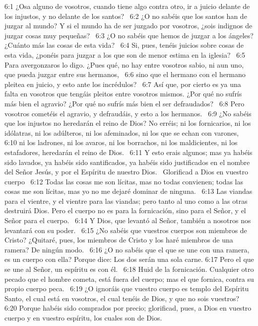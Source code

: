6:1 ¿Osa alguno de vosotros, cuando tiene algo contra otro, ir a juicio delante de los injustos, y no delante de los santos?  
6:2 ¿O no sabéis que los santos han de juzgar al mundo? Y si el mundo ha de ser juzgado por vosotros, ¿sois indignos de juzgar cosas muy pequeñas?  
6:3 ¿O no sabéis que hemos de juzgar a los ángeles? ¿Cuánto más las cosas de esta vida?  
6:4 Si, pues, tenéis juicios sobre cosas de esta vida, ¿ponéis para juzgar a los que son de menor estima en la iglesia?  
6:5 Para avergonzaros lo digo. ¿Pues qué, no hay entre vosotros sabio, ni aun uno, que pueda juzgar entre sus hermanos,  
6:6 sino que el hermano con el hermano pleitea en juicio, y esto ante los incrédulos?  
6:7 Así que, por cierto es ya una falta en vosotros que tengáis pleitos entre vosotros mismos. ¿Por qué no sufrís más bien el agravio? ¿Por qué no sufrís más bien el ser defraudados?  
6:8 Pero vosotros cometéis el agravio, y defraudáis, y esto a los hermanos.  
6:9 ¿No sabéis que los injustos no heredarán el reino de Dios? No erréis; ni los fornicarios, ni los idólatras, ni los adúlteros, ni los afeminados, ni los que se echan con varones,  
6:10 ni los ladrones, ni los avaros, ni los borrachos, ni los maldicientes, ni los estafadores, heredarán el reino de Dios.  
6:11 Y esto erais algunos; mas ya habéis sido lavados, ya habéis sido santificados, ya habéis sido justificados en el nombre del Señor Jesús, y por el Espíritu de nuestro Dios.  
Glorificad a Dios en vuestro cuerpo  
6:12 Todas las cosas me son lícitas, mas no todas convienen; todas las cosas me son lícitas, mas yo no me dejaré dominar de ninguna.  
6:13 Las viandas para el vientre, y el vientre para las viandas; pero tanto al uno como a las otras destruirá Dios. Pero el cuerpo no es para la fornicación, sino para el Señor, y el Señor para el cuerpo.  
6:14 Y Dios, que levantó al Señor, también a nosotros nos levantará con su poder.  
6:15 ¿No sabéis que vuestros cuerpos son miembros de Cristo? ¿Quitaré, pues, los miembros de Cristo y los haré miembros de una ramera? De ningún modo.  
6:16 ¿O no sabéis que el que se une con una ramera, es un cuerpo con ella? Porque dice: Los dos serán una sola carne. 
6:17 Pero el que se une al Señor, un espíritu es con él.  
6:18 Huid de la fornicación. Cualquier otro pecado que el hombre cometa, está fuera del cuerpo; mas el que fornica, contra su propio cuerpo peca.  
6:19 ¿O ignoráis que vuestro cuerpo es templo del Espíritu Santo, el cual está en vosotros, el cual tenéis de Dios, y que no sois vuestros?  
6:20 Porque habéis sido comprados por precio; glorificad, pues, a Dios en vuestro cuerpo y en vuestro espíritu, los cuales son de Dios.  
